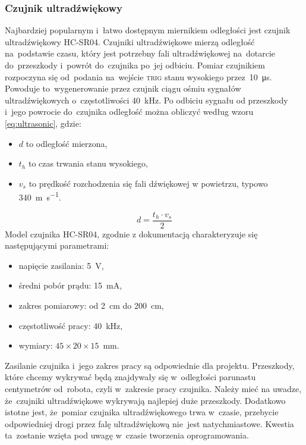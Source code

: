 \documentclass[11pt]{article}
\begin{document}
\subsubsection{Czujnik ultradźwiękowy}
Najbardziej popularnym i~łatwo dostępnym miernikiem odległości jest czujnik ultradźwiękowy HC-SR04.
Czujniki ultradźwiękowe mierzą odległość na~podstawie czasu, który jest potrzebny fali ultradźwiękowej na~dotarcie do~przeszkody i~powrót do~czujnika po~jej odbiciu.
Pomiar czujnikiem rozpoczyna się od~podania na~wejście \textsc{trig} stanu wysokiego przez~10~\si{\micro\second}. Powoduje to~wygenerowanie przez czujnik ciągu ośmiu sygnałów ultradźwiękowych o~częstotliwości 40~\si{\kilo\hertz}. Po odbiciu sygnału od przeszkody i~jego powrocie do~czujnika odległość można obliczyć według wzoru \ref{eq:ultrasonic}, gdzie:
\begin{itemize}
	\item $ d $ to odległość mierzona,
	\item $ t_h $ to czas trwania stanu wysokiego, 
	\item $ v_s $ to prędkość rozchodzenia się fali dźwiękowej w powietrzu, typowo 340~\si{\meter\per\second}.
\end{itemize}
\begin{equation}
\label{eq:ultrasonic}
	d = \frac{t_h \cdot v_s}{2}
\end{equation}
Model czujnika HC-SR04, zgodnie z dokumentacją \cite{ultr_datasheet} charakteryzuje się następującymi parametrami:
\begin{itemize}
	\item napięcie zasilania: 5~\si{\volt},
	\item średni pobór prądu: 15~\si{\milli\ampere},
	\item zakres pomiarowy: od 2~\si{\centi\meter} do 200~\si{\centi\meter},
	\item częstotliwość pracy: 40~\si{\kilo\hertz},
	\item wymiary: $ 45 \times 20 \times 15 $~\si{\milli\meter}.
\end{itemize}
Zasilanie czujnika  i~jego zakres pracy są odpowiednie dla projektu.
Przeszkody, które chcemy wykrywać będą znajdywały się w~odległości parunastu centymetrów od~robota, czyli w~zakresie pracy czujnika.
Należy mieć na uwadze, że~czujniki ultradźwiękowe wykrywają najlepiej duże przeszkody. 
Dodatkowo istotne jest, że~pomiar czujnika ultradźwiękowego trwa w~czasie, przebycie odpowiedniej drogi przez falę ultradźwiękową nie~jest natychmiastowe.
Kwestia ta~zostanie wzięta pod uwagę w~czasie tworzenia oprogramowania.
\end{document}
